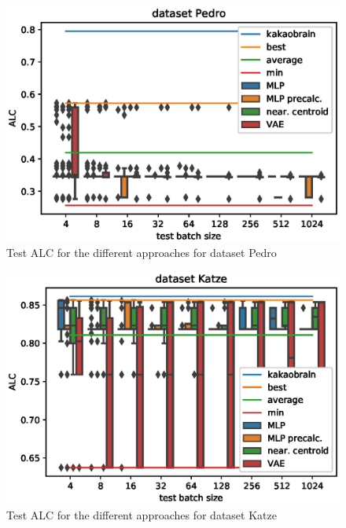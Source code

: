\documentclass{article}
\begin{document}
\begin{figure}[H]
\begin{center}
 	\includegraphics[width=0.99\linewidth]{../figures/17.eps} 
\end{center}
\caption{Test ALC for the different approaches for dataset Pedro}
\label{fig:17}
\end{figure} 
\begin{figure}[H]
\begin{center}
 	\includegraphics[width=0.99\linewidth]{../figures/10.eps} 
\end{center}
\caption{Test ALC for the different approaches for dataset Katze}
\label{fig:10}
\end{figure} 
%
\end{document}
